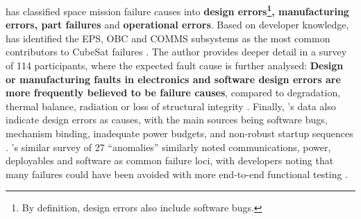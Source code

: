\documentclass[a4paper,nobib,justified,final]{tufte-book}
\begin{document}
\citeauthor{langerReliabilityAssessmentReliability2018} has classified space mission failure causes into \textbf{design errors\footnote{By definition, design errors also include software bugs.}, manufacturing errors, part failures} and \textbf{operational errors}.
Based on developer knowledge, \citeauthor{langerReliabilityAssessmentReliability2018} has identified the \acs{EPS}, \acs{OBC} and \acs{COMMS} subsystems as the most common contributors to CubeSat failures \cite{langerReliabilityAssessmentReliability2018}. The author provides deeper detail in a \citeyear{langerReliabilityCubeSatsStatistical2016} survey of 114 participants, where the expected fault cause is further analysed: \textbf{Design or manufacturing faults in electronics and software design errors are more frequently believed to be failure causes}, compared to degradation, thermal balance, radiation or loss of structural integrity \autocite{langerReliabilityCubeSatsStatistical2016}.
Finally, \citeauthor{swartwoutCubeSatMissionSuccess2019}'s data also indicate design errors as causes, with the main sources being software bugs, mechanism binding, inadequate power budgets, and non-robust startup sequences \cite{swartwoutCubeSatMissionSuccess2019}. \citeauthor{venturiniImprovingMissionSuccess2017}'s similar survey of 27 ``anomalies'' similarly noted communications, power, deployables and software as common failure loci, with developers noting that many failures could have been avoided with more end-to-end functional testing \autocite{venturiniImprovingMissionSuccess2017}.
\end{document}
